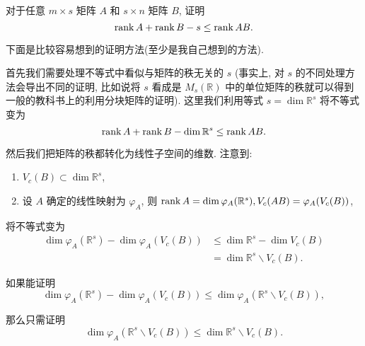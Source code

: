 \documentclass{ctexart}
\begin{document}
\begin{exercise}\label{ex3.8}
    对于任意 $m\times s$ 矩阵 $A$ 和 $s\times n$ 矩阵 $B$, 证明
    \[\operatorname{rank} A+\operatorname{rank} B-s\leq\operatorname{rank}  AB.\]
\end{exercise}
下面是比较容易想到的证明方法(至少是我自己想到的方法).
\begin{thought}
    首先我们需要处理不等式中看似与矩阵的秩无关的 $s$ (事实上, 对 $s$ 的不同处理方法会导出不同的证明, 比如说将 $s$ 看成是 $M_s(\mathbb{R})$ 中的单位矩阵的秩就可以得到一般的教科书上的利用分块矩阵的证明). 这里我们利用等式 $s=\dim\mathbb{R}^s$ 将不等式变为
    \[\operatorname{rank} A+\operatorname{rank} B-\dim\mathbb{R}^s\leq\operatorname{rank}  AB.\]

    然后我们把矩阵的秩都转化为线性子空间的维数. 注意到:
    \begin{enumerate}
        \item $V_c(B)\subset\dim\mathbb{R}^s$,
        \item 设 $A$ 确定的线性映射为 $\varphi_A$, 则 $\operatorname{rank} A=\dim\varphi_A(\mathbb{R}^s),V_c(AB)=\varphi_A(V_c(B))$,
    \end{enumerate}

    将不等式变为
    \begin{align*}
        \dim\varphi_A(\mathbb{R}^s)-\dim\varphi_A(V_c(B)) & \leq\dim\mathbb{R}^s-\dim V_c(B) \\
        & =\dim\mathbb{R}^s\backslash V_c(B).
    \end{align*}

    如果能证明
    \[\dim\varphi_A(\mathbb{R}^s)-\dim\varphi_A(V_c(B))\leq\dim\varphi_A(\mathbb{R}^s\backslash V_c(B)),\]

    那么只需证明
    \[\dim\varphi_A(\mathbb{R}^s\backslash V_c(B))\leq\dim\mathbb{R}^s\backslash V_c(B).\]
\end{thought}
\end{document}
